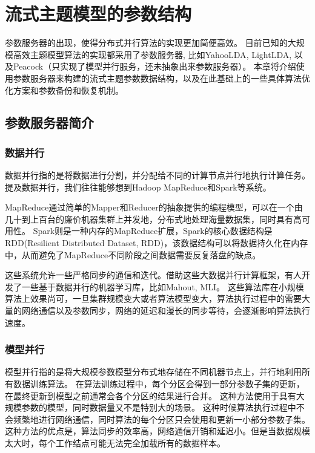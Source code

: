 \chapter{流式主题模型的参数结构}
\label{chapter:parameter}
参数服务器的出现，使得分布式并行算法的实现更加简便高效。
目前已知的大规模高效主题模型算法的实现都采用了参数服务器\cite{li2014scaling}, 
比如YahooLDA\cite{ahmed2012scalable}, LightLDA\cite{yuan2015lightlda}, 以及Peacock\cite{li2014scaling}（只实现了模型并行服务，还未抽象出来参数服务器）。
本章将介绍使用参数服务器来构建的流式主题参数数据结构，以及在此基础上的一些具体算法优化方案和参数备份和恢复机制。

\section{参数服务器简介}
\subsection{数据并行}
数据并行指的是将数据进行分割，并分配给不同的计算节点并行地执行计算任务。
提及数据并行，我们往往能够想到Hadoop MapReduce和Spark等系统。

MapReduce通过简单的Mapper和Reducer的抽象提供的编程模型，可以在一个由几十到上百台的廉价机器集群上并发地，分布式地处理海量数据集，同时具有高可用性。
Spark则是一种内存的MapReduce扩展，Spark的核心数据结构是RDD(Resilient Distributed Dataset, RDD)，该数据结构可以将数据持久化在内存中，从而避免了MapReduce不同阶段之间数据需要反复落盘的缺点。

这些系统允许一些严格同步的通信和迭代。借助这些大数据并行计算框架，有人开发了一些基于数据并行的机器学习库，比如Mahout\cite{mahout}, MLI\cite{sparks2013mli}。
这些算法库在小规模算法上效果尚可，一旦集群规模变大或者算法模型变大，算法执行过程中的需要大量的网络通信以及参数同步，网络的延迟和漫长的同步等待，会逐渐影响算法执行速度。

\subsection{模型并行}
模型并行指的是将大规模参数模型分布式地存储在不同机器节点上，并行地利用所有数据训练算法。
在算法训练过程中，每个分区会得到一部分参数子集的更新，在最终更新到模型之前通常会各个分区的结果进行合并。
这种方法使用于具有大规模参数的模型，同时数据量又不是特别大的场景。
这种时候算法执行过程中不会频繁地进行网络通信，同时算法的每个分区只会使用和更新一小部分参数子集。这种方法的优点是，算法同步的效率高，网络通信开销和延迟小。但是当数据规模太大时，每个工作结点可能无法完全加载所有的数据样本。


